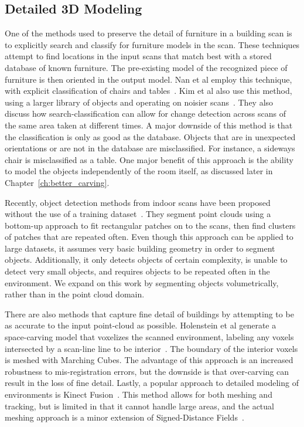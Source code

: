\documentclass[12pt,onecolumn,oneside]{book}
\begin{document}
\subsection{Detailed 3D Modeling}
\label{ssec:background_3dmodeling}

One of the methods used to preserve the detail of furniture in a building scan is to explicitly search and classify for furniture models in the scan.  These techniques attempt to find locations in the input scans that match best with a stored database of known furniture.  The pre-existing model of the recognized piece of furniture is then oriented in the output model.  Nan et al employ this technique, with explicit classification of chairs and tables~\cite{SearchClassifyPointcloud}.  Kim et al also use this method, using a larger library of objects and operating on noisier scans~\cite{Kim12}.  They also discuss how search-classification can allow for change detection across scans of the same area taken at different times.  A major downside of this method is that the classification is only as good as the database.  Objects that are in unexpected orientations or are not in the database are misclassified.  For instance, a sideways chair is misclassified as a table.  One major benefit of this approach is the ability to model the objects independently of the room itself, as discussed later in Chapter~\ref{ch:better_carving}.  

Recently, object detection methods from indoor scans have been proposed without the use of a training dataset~\cite{Mattausch14}.  They segment point clouds using a bottom-up approach to fit rectangular patches on to the scans, then find clusters of patches that are repeated often.  Even though this approach can be applied to large datasets, it assumes very basic building geometry in order to segment objects.  Additionally, it only detects objects of certain complexity, is unable to detect very small objects, and requires objects to be repeated often in the environment.  We expand on this work by segmenting objects volumetrically, rather than in the point cloud domain.

There are also methods that capture fine detail of buildings by attempting to be as accurate to the input point-cloud as possible.  Holenstein et al generate a space-carving model that voxelizes the scanned environment, labeling any voxels intersected by a scan-line line to be interior~\cite{Carving}.  The boundary of the interior voxels is meshed with Marching Cubes.  The advantage of this approach is an increased robustness to mis-registration errors, but the downside is that over-carving can result in the loss of fine detail.  Lastly, a popular approach to detailed modeling of environments is Kinect Fusion~\cite{KinectFusion,Kintinuous}.  This method allows for both meshing and tracking, but is limited in that it cannot handle large areas, and the actual meshing approach is a minor extension of Signed-Distance Fields~\cite{SignedDistanceFields}. 
\end{document}
